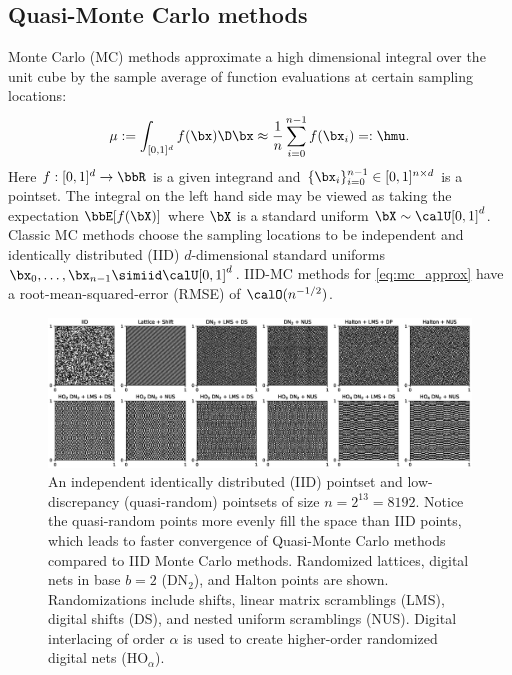\documentclass[acmsmall]{acmart}
\begin{document}
\subsection{Quasi-Monte Carlo methods}

Monte Carlo (MC) methods approximate a high dimensional integral over the unit cube by the sample average of function evaluations at certain sampling locations:
\begin{equation}
    \mu := \int_{[0,1]^d} f(\bx) \D \bx \approx \frac{1}{n} \sum_{i=0}^{n-1} f(\bx_i) =: \hmu.
    \label{eq:mc_approx}
\end{equation}
Here $f: [0,1]^d \to \bbR$ is a given integrand and $\{\bx_i\}_{i=0}^{n-1} \in [0,1]^{n \times d}$ is a pointset. The integral on the left hand side may be viewed as taking the expectation $\bbE[f(\bX)]$ where $\bX$ is a standard uniform $\bX \sim \calU[0,1]^d$. Classic MC methods choose the sampling locations to be independent and identically distributed (IID) $d$-dimensional standard uniforms $\bx_0,\dots,\bx_{n-1} \simiid \calU[0,1]^d$. IID-MC methods for \eqref{eq:mc_approx} have a root-mean-squared-error (RMSE) of $\calO(n^{-1/2})$.

\begin{figure}%
    \centering
    \includegraphics[width=1\textwidth]{./figs/pointsets.eps}
    \caption{An independent identically distributed (IID) pointset and low-discrepancy (quasi-random) pointsets of size $n=2^{13}=8192$. Notice the quasi-random points more evenly fill the space than IID points, which leads to faster convergence of Quasi-Monte Carlo methods compared to IID Monte Carlo methods. Randomized lattices, digital nets in base $b=2$ (DN${}_{2}$), and Halton points are shown. Randomizations include shifts, linear matrix scramblings (LMS), digital shifts (DS), and nested uniform scramblings (NUS). Digital interlacing of order $\alpha$ is used to create higher-order randomized digital nets (HO${}_\alpha$).}
    \Description[]{}
    \label{fig:pointsets}
\end{figure}
\end{document}
